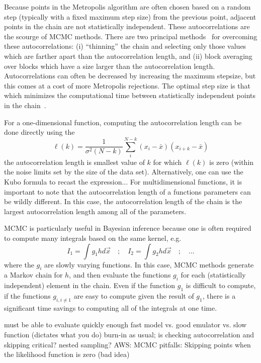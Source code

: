 Because points in the Metropolis algorithm are often chosen based on a
random step (typically with a fixed maximum step size) from the
previous point, adjacent points in the chain are not statistically
independent. These autocorrelations are the scourge of MCMC methods.
There are two principal methods~\cite{Allen89} for overcoming these
autocorrelations: (i) ``thinning'' the chain and selecting only those
values which are farther apart than the autocorrelation length, and
(ii) block averaging over blocks which have a size larger than the
autocorrelation length. Autocorrelations can often be decreased
by increasing the maximum stepsize, but this comes at a cost of
more Metropolis rejections. The optimal step size is that which
minimizes the computational time between statistically independent
points in the chain~\cite{Sokal80}.

For a one-dimensional function, computing the autocorrelation length
can be done directly using the 
\begin{equation}
  \ell(k) = \frac{1}{\sigma^2(N-k)}
  \sum_i^{N-k} (x_i- \bar{x})(x_{i+k}- \bar{x})
\end{equation}
the autocorrelation length is smallest value of $k$ for which
$\ell(k)$ is zero (within the noise limits set by the size of the data
set). Alternatively, one can use the Kubo formula to
recast the expression...  For multidimensional functions, it is important to note that
the autocorrelation length of a functions parameters can be wildly
different. In this case, the autocorrelation length of the chain is
the largest autocorrelation length among all of the parameters.

MCMC is particularly useful in Bayesian inference because one is
often required to compute many integrals based on the same kernel,
e.g.
\begin{equation}
  I_1 = \int g_1 h d \vec{x} \quad ; \quad
  I_2 = \int g_2 h d \vec{x} \quad ; \quad \ldots
\end{equation}
where the $g_i$ are slowly varying functions. In this case, MCMC
methods generate a Markov chain for $h$, and then evaluate the
functions $g_i$ for each (statistically independent) element in the
chain. Even if the function $g_1$ is difficult to compute, 
if the functions $g_{i,i\neq 1}$ are easy to compute given the
result of $g_1$, there is a significant time savings to computing
all of the integrals at one time.


  \bi
    \I must be able to evaluate quickly enough
    \I fast model vs. good emulator vs. slow function (dictates what you do)
    \I burn-in as usual; is checking autocorrelation and skipping critical?
    \I nested sampling?
    \I AWS: MCMC pitfalls: Skipping points when the likelihood
    function is zero (bad idea)
  \ei


